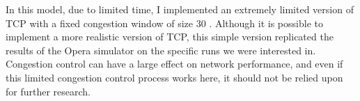 In this model, due to limited time, I implemented an extremely limited version of TCP with a fixed congestion window of size 30 .
Although it is possible to implement a more realistic version of TCP, this simple version replicated the results of the Opera simulator on the specific runs we were interested in.
Congestion control can have a large effect on network performance, and even if this limited congestion control process works here, it should not be relied upon for further research.
